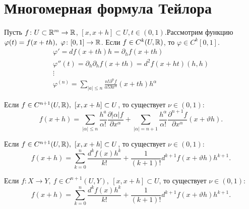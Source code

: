\documentclass[11pt,dvipsnames]{report}
\begin{document}
\section{Многомерная формула Тейлора}
Пусть $ f\colon U \subset \mathbb{R}^{m} \to  \mathbb{R}$, $ [x, x+h] \subset U, t \in (0, 1)$.Рассмотрим функцию $ \varphi (t) = f(x+th), ~\varphi \colon [0, 1] \to  \mathbb{R}$. Если $ f \in C^{k}(U, \mathbb{R})$, то $ \varphi \in  C^{k}[0, 1]$.
\begin{align*}
    \varphi ' = df(x + th)h = \partial _h f(x+th) \\
    \varphi ''(t) = \partial _h\partial _h f(x + th) = d^2f(x+ht)(h, h) \\
    \vdots
    \\
    \varphi ^{(n)} = \sum_{\lvert a \rvert \le  n} \frac{n! \partial ^{n} f}{\alpha ! \partial x^{\alpha }}  (x+ th) h^{\alpha }
\end{align*}
\begin{thm}
    Если $ f \in C^{n+1}(U, \mathbb{R}), ~[x, x+h] \subset U$, то существует $ \nu \in (0, 1)\colon $
    \[
	f(x+h) = \sum_{\lvert \alpha  \rvert \le n}^{} \frac{h^{ a  }}{\alpha !} \frac{\partial \lvert \alpha  \rvert f}{\partial x^{\alpha }} + \sum_{\lvert \alpha  \rvert = n+1}^{} \frac{h^{\alpha }}{\alpha !} \frac{\partial ^{n+1} f}{\partial x^{\alpha }} (x + \vartheta h)
    .\] 
\end{thm}
\begin{thm}
    Если $ f \in C^{n+1}(U, \mathbb{R}), ~[x, x+h] \subset U$, то существует $ \nu \in (0, 1)\colon $
    \[
	f(x+h) = \sum_{k=0}^{n}  \frac{d^{k} f(x) h^{k}}{k!} + \frac{1}{(k+1)!} d^{k+1}f(x+ \vartheta h)h^{k+1}
    .\] 
\end{thm}
\begin{thm}
    Если $ f\colon X \to  Y, ~f \in C^{n+1}(U, Y), ~[x, x+h] \subset U$, то существует $ \nu \in (0, 1)\colon $
    \[
	f(x+h) = \sum_{k=0}^{n}  \frac{d^{k} f(x) h^{k}}{k!} + \frac{1}{(k+1)!} d^{k+1}f(x+ \vartheta h)h^{k+1}
    .\] 
\end{thm}
\end{document}
